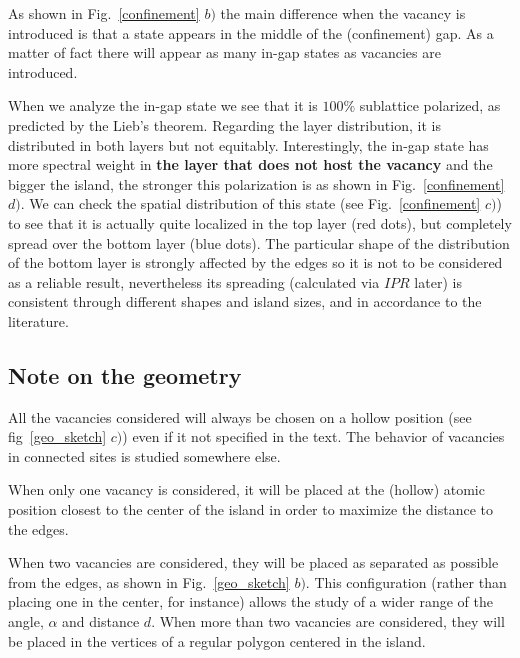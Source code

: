 \documentclass[a4paper]{article}
\begin{document}
As shown in Fig.~\ref{confinement} $b)$ the main difference when the vacancy is introduced is that a state appears in the middle of the (confinement) gap. As a matter of fact there will appear as many in-gap states as vacancies are introduced.

When we analyze the in-gap state we see that it is $100\%$ sublattice polarized, as predicted by the Lieb's theorem\cite{Lieb1989}. Regarding the layer distribution, it is distributed in both layers but not equitably. Interestingly, the in-gap state has more spectral weight in \textbf{the layer that does not host the vacancy} and the bigger the island, the stronger this polarization is as shown in Fig.~\ref{confinement} $d)$.
We can check the spatial distribution of this state (see Fig.~\ref{confinement} $c)$) to see that it is actually quite localized in the top layer (red dots), but completely spread over the bottom layer (blue dots). The particular shape of the distribution of the bottom layer is strongly affected by the edges so it is not to be considered as a reliable result, nevertheless its spreading (calculated via $IPR$ later) is consistent through different shapes and island sizes, and in accordance to the literature\cite{Castro2010}.


\subsection{Note on the geometry}
All the vacancies considered will always be chosen on a hollow position (see fig~\ref{geo_sketch} $c)$) even if it not specified in the text. The behavior of vacancies in connected sites is studied somewhere else\cite{Castro2010}.

When only one vacancy is considered, it will be placed at the (hollow) atomic position closest to the center of the island in order to maximize the distance to the edges.

When two vacancies are considered, they will be placed as separated as possible from the edges, as shown in Fig.~\ref{geo_sketch} $b)$. This configuration (rather than placing one in the center, for instance) allows the study of a wider range of the angle, $\alpha$ and distance $d$.
When more than two vacancies are considered, they will be placed in the vertices of a regular polygon centered in the island.

\end{document}
